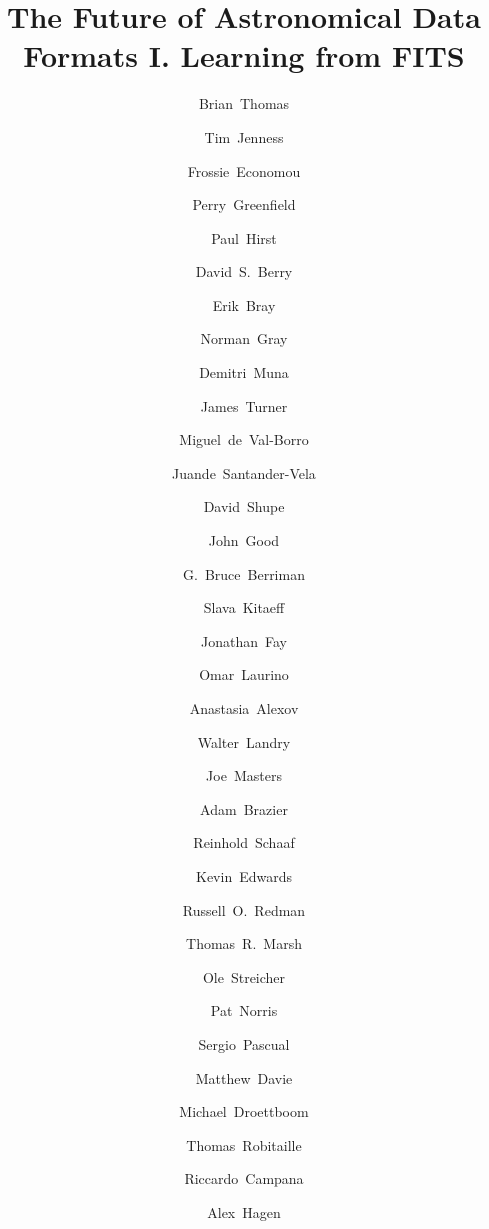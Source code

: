 \documentclass[final,authoryear,5p,times,twocolumn]{elsarticle}
\begin{document}
\begin{frontmatter}



\title{The Future of Astronomical Data Formats I. Learning from FITS}


\author[noao]{Brian~Thomas}
\author[cornell]{Tim~Jenness}
\author[noao]{Frossie~Economou}
\author[stsci]{Perry~Greenfield}
\author[geminin]{Paul~Hirst}
\author[jac]{David~S.~Berry}
\author[stsci]{Erik~Bray}
\author[glasgow]{Norman~Gray}
\author[ohio]{Demitri~Muna}
\author[geminis]{James~Turner}
\author[princeton]{Miguel~de~Val-Borro}
\author[iaa]{Juande~Santander-Vela}
\author[ipac]{David~Shupe}
\author[ipac]{John~Good}
\author[ipac]{G.~Bruce~Berriman}
\author[icrar]{Slava~Kitaeff}
\author[microsoft]{Jonathan~Fay}
\author[sao]{Omar~Laurino}
\author[stsci]{Anastasia~Alexov}
\author[ipac]{Walter~Landry}
\author[nrao]{Joe~Masters}
\author[cornell]{Adam~Brazier}
\author[aifa]{Reinhold~Schaaf}
\author[uwaterloo]{Kevin~Edwards}
\author[jac]{Russell~O.~Redman}
\author[warwick]{Thomas~R.~Marsh}
\author[aip]{Ole~Streicher}
\author[noao]{Pat~Norris}
\author[ucm]{Sergio~Pascual}
\author[unsw]{Matthew~Davie}
\author[stsci]{Michael~Droettboom}
\author[mpia]{Thomas~Robitaille}
\author[iasf]{Riccardo~Campana}
\author[psu]{Alex~Hagen}



\end{frontmatter}
\end{document}
